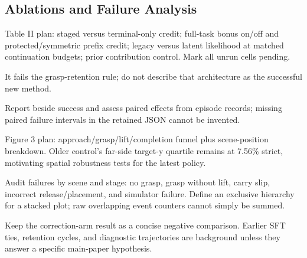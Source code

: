 \subsection{Ablations and Failure Analysis}
\begin{outline}
\item Table II plan: staged versus terminal-only credit; full-task bonus on/off and protected/symmetric prefix credit; legacy versus latent likelihood at matched continuation budgets; prior contribution control. Mark all unrun cells pending.
\item {} It fails the grasp-retention rule; do not describe that architecture as the successful new method.
\item {} Report beside success and assess paired effects from episode records; missing paired failure intervals in the retained JSON cannot be invented.
\item Figure 3 plan: approach/grasp/lift/completion funnel plus scene-position breakdown. Older control's far-side target-y quartile remains at 7.56\% strict, motivating spatial robustness tests for the latest policy.
\item Audit failures by scene and stage: no grasp, grasp without lift, carry slip, incorrect release/placement, and simulator failure. Define an exclusive hierarchy for a stacked plot; raw overlapping event counters cannot simply be summed.
\item Keep the correction-arm result as a concise negative comparison. Earlier SFT ties, retention cycles, and diagnostic trajectories are background unless they answer a specific main-paper hypothesis.
\end{outline}

